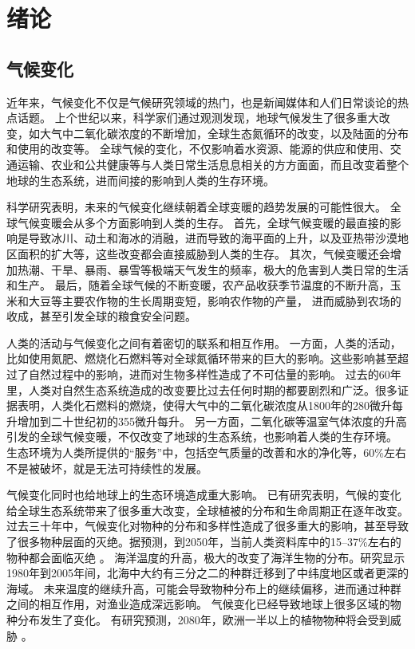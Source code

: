 \chapter{绪论}
\label{cha:intro}

\section{气候变化}

近年来，气候变化不仅是气候研究领域的热门，也是新闻媒体和人们日常谈论的热点话题。
上个世纪以来，科学家们通过观测发现，地球气候发生了很多重大改变，如大气中二氧化碳浓度的不断增加，全球生态氮循环的改变，以及陆面的分布和使用的改变等\cite{vitousek1994beyond}。
全球气候的变化，不仅影响着水资源、能源的供应和使用、交通运输、农业和公共健康等与人类日常生活息息相关的方方面面\cite{karl2009global}，而且改变着整个地球的生态系统，进而间接的影响到人类的生存环境。



科学研究表明，未来的气候变化继续朝着全球变暖的趋势发展的可能性很大\cite{solomon2007climate,stocker2013ipcc}。
全球气候变暖会从多个方面影响到人类的生存。
首先，全球气候变暖的最直接的影响是导致冰川、动土和海冰的消融，进而导致的海平面的上升，以及亚热带沙漠地区面积的扩大等，这些改变都会直接威胁到人类的生存\cite{stocker2013ipcc}。
其次，气候变暖还会增加热潮、干旱、暴雨、暴雪等极端天气发生的频率，极大的危害到人类日常的生活和生产\cite{solomon2007climate}。
最后，随着全球气候的不断变暖，农产品收获季节温度的不断升高，玉米和大豆等主要农作物的生长周期变短，影响农作物的产量， 进而威胁到农场的收成，甚至引发全球的粮食安全问题\cite{battisti2009historical,adams1990global,smith1989potential}。 

人类的活动与气候变化之间有着密切的联系和相互作用。
一方面，人类的活动，比如使用氮肥、燃烧化石燃料等对全球氮循环带来的巨大的影响。这些影响甚至超过了自然过程中的影响，进而对生物多样性造成了不可估量的影响。
过去的60年里，人类对自然生态系统造成的改变要比过去任何时期的都要剧烈和广泛。很多证据表明，人类化石燃料的燃烧，使得大气中的二氧化碳浓度从1800年的280微升每升增加到二十世纪初的355微升每升\cite{vitousek1994beyond}。
另一方面，二氧化碳等温室气体浓度的升高引发的全球气候变暖，不仅改变了地球的生态系统，也影响着人类的生存环境。
生态环境为人类所提供的“服务”中，包括空气质量的改善和水的净化等，60\%左右不是被破坏，就是无法可持续性的发展\cite{assessment2005ecosystems}。



气候变化同时也给地球上的生态环境造成重大影响。
已有研究表明，气候的变化给全球生态系统带来了很多重大改变，全球植被的分布和生命周期正在逐年改变\cite{parmesan2003globally}。
过去三十年中，气候变化对物种的分布和多样性造成了很多重大的影响，甚至导致了很多物种层面的灭绝。据预测，到2050年，当前人类资料库中的15–37\%左右的物种都会面临灭绝 \cite{thomas2004extinction} 。
海洋温度的升高，极大的改变了海洋生物的分布。研究显示1980年到2005年间，北海中大约有三分之二的种群迁移到了中纬度地区或者更深的海域\cite{perry2005climate}。
未来温度的继续升高，可能会导致物种分布上的继续偏移，进而通过种群之间的相互作用，对渔业造成深远影响。
气候变化已经导致地球上很多区域的物种分布发生了变化。 
有研究预测，2080年，欧洲一半以上的植物物种将会受到威胁\cite{thuiller2005climate} 。

